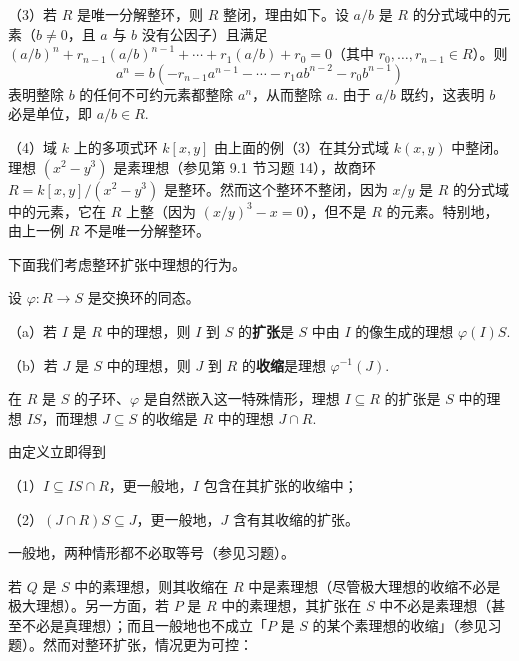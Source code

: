 （3）若 \(R\) 是唯一分解整环，则 \(R\) 整闭，理由如下。设 \(a/b\) 是 \(R\) 的分式域中的元素（\(b \neq 0\)，且 \(a\) 与 \(b\) 没有公因子）且满足 \((a/b)^n+r_{n-1}(a/b)^{n-1}+\cdots+r_1(a/b)+r_0 = 0\)（其中 \(r_0, \ldots, r_{n-1} \in R\)）。则
\[
a^n = b(-r_{n-1}a^{n-1}-\cdots-r_1ab^{n-2}-r_0b^{n-1})
\]
表明整除 \(b\) 的任何不可约元素都整除 \(a^n\)，从而整除 \(a\). 由于 \(a/b\) 既约，这表明 \(b\) 必是单位，即 \(a/b \in R\).

（4）域 \(k\) 上的多项式环 \(k[x,y]\) 由上面的例（3）在其分式域 \(k(x,y)\) 中整闭。理想 \((x^2-y^3)\) 是素理想（参见第 9.1 节习题 14），故商环 \(R = k[x,y]/(x^2-y^3)\) 是整环。然而这个整环不整闭，因为 \(x/y\) 是 \(R\) 的分式域中的元素，它在 \(R\) 上整（因为 \((x/y)^3-x = 0\)），但不是 \(R\) 的元素。特别地，由上一例 \(R\) 不是唯一分解整环。

下面我们考虑整环扩张中理想的行为。

\begin{definition}
设 \(\varphi : R \to S\) 是交换环的同态。

（a）若 \(I\) 是 \(R\) 中的理想，则 \(I\) 到 \(S\) 的\textbf{扩张}是 \(S\) 中由 \(I\) 的像生成的理想 \(\varphi(I)S\).

（b）若 \(J\) 是 \(S\) 中的理想，则 \(J\) 到 \(R\) 的\textbf{收缩}是理想 \(\varphi^{-1}(J)\).
\end{definition}

在 \(R\) 是 \(S\) 的子环、\(\varphi\) 是自然嵌入这一特殊情形，理想 \(I \subseteq R\) 的扩张是 \(S\) 中的理想 \(IS\)，而理想 \(J \subseteq S\) 的收缩是 \(R\) 中的理想 \(J \cap R\).

由定义立即得到

（1）\(I \subseteq IS \cap R\)，更一般地，\(I\) 包含在其扩张的收缩中；

（2）\((J \cap R)S \subseteq J\)，更一般地，\(J\) 含有其收缩的扩张。

一般地，两种情形都不必取等号（参见习题）。

若 \(Q\) 是 \(S\) 中的素理想，则其收缩在 \(R\) 中是素理想（尽管极大理想的收缩不必是极大理想）。另一方面，若 \(P\) 是 \(R\) 中的素理想，其扩张在 \(S\) 中不必是素理想（甚至不必是真理想）；而且一般地也不成立「\(P\) 是 \(S\) 的某个素理想的收缩」（参见习题）。然而对整环扩张，情况更为可控：

